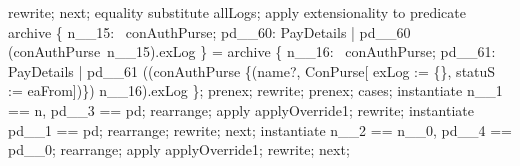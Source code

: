 \begin{LPScript}
\begin{zproof}[lPromotedAuxWorldClearExceptionLogType]
        rewrite;
    next;
        equality substitute allLogs;
        apply extensionality to predicate
            archive \cup \{ n\_\_15: \dom~conAuthPurse; pd\_\_60: PayDetails
                | pd\_\_60 \in (conAuthPurse~n\_\_15).exLog \}
            = archive \cup \{ n\_\_16: \dom~conAuthPurse; pd\_\_61: PayDetails
                | pd\_\_61 \in ((conAuthPurse \oplus \{(name?, \theta ConPurse[
                    exLog := \{\}, statuS := eaFrom])\}) n\_\_16).exLog \};
        prenex;
        rewrite;
        prenex;
        cases;
            instantiate n\_\_1 == n, pd\_\_3 == pd;
            rearrange;
            apply applyOverride1;
            rewrite;
            instantiate pd\_\_1 == pd;
            rearrange;
            rewrite;
        next;
            instantiate n\_\_2 == n\_\_0, pd\_\_4 == pd\_\_0;
            rearrange;
            apply applyOverride1;
            rewrite;
    next;
\end{zproof}\end{LPScript}

